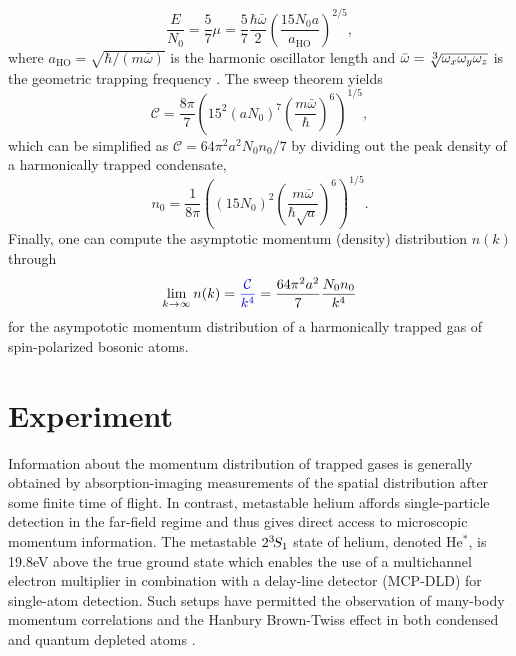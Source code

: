 	\begin{equation}
		\frac{E}{N_0} = \frac{5}{7}\mu = \frac{5}{7} \frac{\hbar \bar{\omega}}{2} \left(\frac{15 N_0 a}{a_\textrm{HO}}\right)^{2/5},
		\label{mu}
	\end{equation}
	where $a_\textrm{HO} = \sqrt{\hbar/(m \bar{\omega})}$ is the harmonic oscillator length and $\bar{\omega}=\sqrt[\uproot{2}\scriptstyle 3]{\omega_x \omega_y \omega_z}$ is the geometric trapping frequency \cite{PitaevskiiStringari,PethickSmith}. The sweep theorem yields
	\begin{equation}
		\mathcal{C} = \frac{8\pi}{7} \left(15^{2}(a N_0)^{7} \left(\frac{m \bar{\omega}}{\hbar}\right)^{6}\right)^{1/5},
		\label{eqn:TotalHarmonicContact}
	\end{equation}
	which can be simplified as $\mathcal{C} = 64\pi^2a^2 N_0 n_0/7$ by dividing out the peak density of a harmonically trapped condensate,
	\begin{equation}
		n_0 = \frac{1}{8 \pi}\left( (15N_0)^2 \left(\frac{m \bar{\omega}}{\hbar\sqrt{a}}\right)	 ^{6}\right)^{1/5}.
		\label{eqn:n0}
	\end{equation}
	Finally, one can compute the asymptotic momentum (density) distribution $n(k)$ through
	\begin{equation}
		\lim_{k\rightarrow\infty} n(k) = {\color{blue}{\frac{\mathcal{C}}{k^4}}} = \frac{64\pi^2a^2}{7} \frac{N_0n_0}{k^4}
		\label{eqn:pred_scaling}
	\end{equation}
	for the asympototic momentum distribution of a harmonically trapped gas of spin-polarized bosonic atoms. 

\section{Experiment} 
	Information about the momentum distribution of trapped gases is generally obtained by absorption-imaging measurements of the spatial distribution after some finite time of flight. In contrast, metastable helium affords single-particle detection in the far-field regime and thus gives direct access to microscopic momentum information. The metastable $2^{3\!}S_1$ state of helium, denoted He$^*$, is 19.8eV above the true ground state \cite{Hodgman09} which enables the use of a multichannel electron multiplier in combination with a delay-line detector (MCP-DLD) \cite{Manning10} for single-atom detection. Such setups have permitted the observation of many-body momentum correlations \cite{Hodgman11,Dall13} and the Hanbury Brown-Twiss effect in both condensed \cite{Schellekens05,Jeltes07,Manning10,Dall11,Perrin07,Perrin12} and quantum depleted atoms \cite{Cayla20}. 
	
